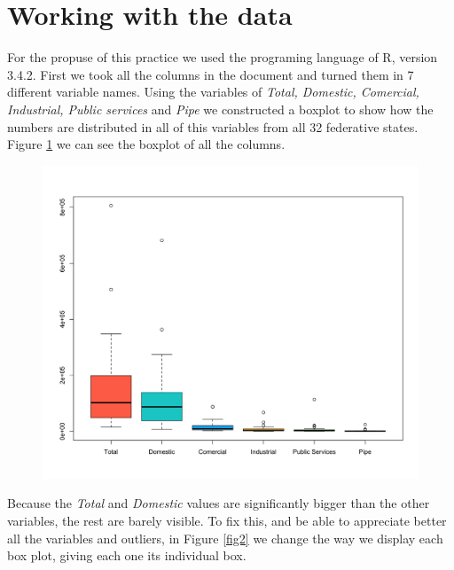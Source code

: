\documentclass{article}
\begin{document}
\section{Working with the data}

For the propuse of this practice we used the programing language of R, version 3.4.2. First we took all the columns in the document and turned them in 7 different variable names. Using the variables of \textit{Total, Domestic, Comercial, Industrial, Public services} and \textit{Pipe} we constructed a boxplot to show how the numbers are distributed in all of this variables from all 32 federative states. Figure \ref{fig1} we can see the boxplot of all the columns.\\

\begin{figure}[htp]
	\centering
	\includegraphics[width=\linewidth]{t1.png}
	\caption{}\label{fig1}
\end{figure}

\clearpage
 
Because the \textit{Total} and \textit{Domestic} values are significantly bigger than the other variables, the rest are barely visible. To fix this, and be able to appreciate better all the variables and outliers, in Figure \ref{fig2} we change the way we display each box plot, giving each one its individual box.\\
\end{document}
